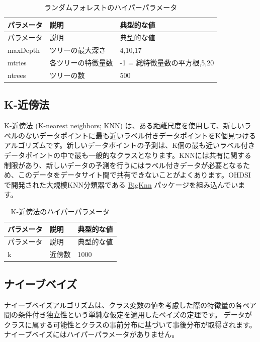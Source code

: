 \documentclass[
  11pt]{book}
\theoremstyle{definition}
\theoremstyle{definition}
\theoremstyle{definition}
\theoremstyle{definition}
\theoremstyle{remark}
\begin{document}
\begin{longtable}[]{@{}lll@{}}
\caption{\label{tab:randomForestParameters} ランダムフォレストのハイパーパラメータ}\tabularnewline
\toprule\noalign{}
パラメータ & 説明 & 典型的な値 \\
\midrule\noalign{}
\endfirsthead
\toprule\noalign{}
パラメータ & 説明 & 典型的な値 \\
\midrule\noalign{}
\endhead
\bottomrule\noalign{}
\endlastfoot
maxDepth & ツリーの最大深さ & 4,10,17 \\
mtries & 各ツリーの特徴量数 & -1 = 総特徴量数の平方根,5,20 \\
ntrees & ツリーの数 & 500 \\
\end{longtable}

\subsection{K-近傍法}\label{k-ux8fd1ux508dux6cd5}

K-近傍法 (K-nearest neighbors; KNN) は、ある距離尺度を使用して、新しいラベルのないデータポイントに最も近いラベル付きデータポイントをK個見つけるアルゴリズムです。新しいデータポイントの予測は、K個の最も近いラベル付きデータポイントの中で最も一般的なクラスとなります。KNNには共有に関する制限があり、新しいデータの予測を行うにはラベル付きデータが必要となるため、このデータをデータサイト間で共有できないことがよくあります。OHDSIで開発された大規模KNN分類器である \href{https://github.com/OHDSI/BigKnn}{BigKnn} パッケージを組み込んでいます。  

\begin{longtable}[]{@{}lll@{}}
\caption{\label{tab:knnParameters} K-近傍法のハイパーパラメータ}\tabularnewline
\toprule\noalign{}
パラメータ & 説明 & 典型的な値 \\
\midrule\noalign{}
\endfirsthead
\toprule\noalign{}
パラメータ & 説明 & 典型的な値 \\
\midrule\noalign{}
\endhead
\bottomrule\noalign{}
\endlastfoot
k & 近傍数 & 1000 \\
\end{longtable}

\subsection{ナイーブベイズ}\label{ux30caux30a4ux30fcux30d6ux30d9ux30a4ux30ba}

ナイーブベイズアルゴリズムは、クラス変数の値を考慮した際の特徴量の各ペア間の条件付き独立性という単純な仮定を適用したベイズの定理です。 データがクラスに属する可能性とクラスの事前分布に基づいて事後分布が取得されます。 ナイーブベイズにはハイパーパラメータがありません。 
\end{document}
